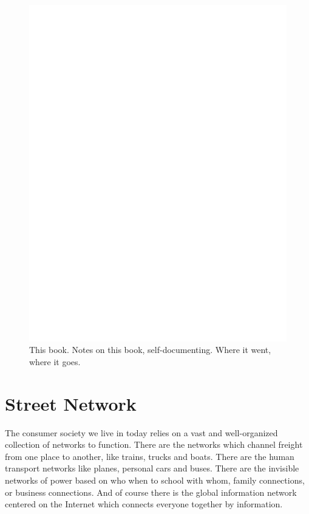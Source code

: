\documentclass{report}
\begin{document}
\begin{figure}
	\centering
	\includegraphics[width=5in]{imageserver/uploadimages/image3.png}
	\caption{This book.  Notes on this book, self-documenting. Where it went, where it goes.}
\end{figure}


\section{Street Network}

The consumer society we live in today relies on a vast and
well-organized collection of networks to function. There are the
networks which channel freight from one place to another, like trains,
trucks and boats. There are the human transport networks like planes,
personal cars and buses. There are the invisible networks of power based
on who when to school with whom, family connections, or business
connections. And of course there is the global information network
centered on the Internet which connects everyone together by
information.
\end{document}
